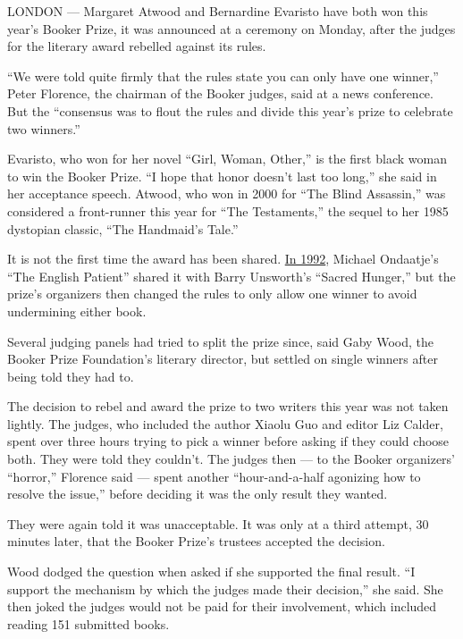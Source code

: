 LONDON --- Margaret Atwood and Bernardine Evaristo have both won this
year's Booker Prize, it was announced at a ceremony on Monday, after the
judges for the literary award rebelled against its rules.

``We were told quite firmly that the rules state you can only have one
winner,'' Peter Florence, the chairman of the Booker judges, said at a
news conference. But the ``consensus was to flout the rules and divide
this year's prize to celebrate two winners.''

Evaristo, who won for her novel ``Girl, Woman, Other,'' is the first
black woman to win the Booker Prize. ``I hope that honor doesn't last
too long,'' she said in her acceptance speech. Atwood, who won in 2000
for ``The Blind Assassin,'' was considered a front-runner this year for
``The Testaments,'' the sequel to her 1985 dystopian classic, ``The
Handmaid's Tale.''

It is not the first time the award has been shared.
\href{https://www.nytimes3xbfgragh.onion/1992/10/14/books/book-notes-a-lost-work-by-joyce-fuels-scholarly-debate.html}{In
1992}, Michael Ondaatje's ``The English Patient'' shared it with Barry
Unsworth's ``Sacred Hunger,'' but the prize's organizers then changed
the rules to only allow one winner to avoid undermining either book.

Several judging panels had tried to split the prize since, said Gaby
Wood, the Booker Prize Foundation's literary director, but settled on
single winners after being told they had to.

The decision to rebel and award the prize to two writers this year was
not taken lightly. The judges, who included the author Xiaolu Guo and
editor Liz Calder, spent over three hours trying to pick a winner before
asking if they could choose both. They were told they couldn't. The
judges then --- to the Booker organizers' ``horror,'' Florence said ---
spent another ``hour-and-a-half agonizing how to resolve the issue,''
before deciding it was the only result they wanted.

They were again told it was unacceptable. It was only at a third
attempt, 30 minutes later, that the Booker Prize's trustees accepted the
decision.

Wood dodged the question when asked if she supported the final result.
``I support the mechanism by which the judges made their decision,'' she
said. She then joked the judges would not be paid for their involvement,
which included reading 151 submitted books.

